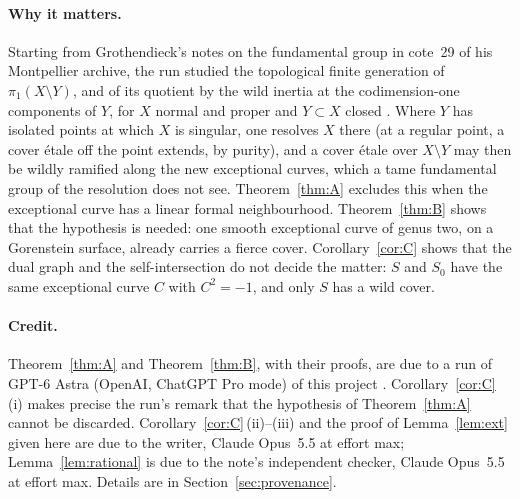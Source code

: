 \documentclass[11pt,a4paper]{article}
\theoremstyle{definition}
\begin{document}
\paragraph{Why it matters.} Starting from Grothendieck's notes on the
fundamental group in cote~29 of his Montpellier archive, the run
\cite{SA12} studied the topological finite generation of
$\pi_1(X\setminus Y)$, and of its quotient by the wild inertia at the
codimension-one components of $Y$, for $X$ normal and proper and $Y\subset
X$ closed \cite[\S4.1]{SA12}. Where $Y$ has isolated points at which $X$ is
singular, one resolves $X$ there (at a regular point, a cover \'etale off the
point extends, by purity), and a cover \'etale over $X\setminus Y$ may then
be wildly ramified along the new exceptional curves, which a tame fundamental group of the
resolution does not see. Theorem~\ref{thm:A} excludes this when the
exceptional curve has a linear formal neighbourhood. Theorem~\ref{thm:B}
shows that the hypothesis is needed: one smooth exceptional curve of genus
two, on a Gorenstein surface, already carries a fierce cover. Corollary~\ref{cor:C} shows that the dual graph and the
self-intersection do not decide the matter: $S$ and $S_0$ have the same
exceptional curve $C$ with $C^2=-1$, and only $S$ has a wild cover.

\paragraph{Credit.} Theorem~\ref{thm:A} and Theorem~\ref{thm:B}, with their
proofs, are due to a run of GPT-6 Astra (OpenAI, ChatGPT Pro mode) of this
project \cite{SA12}. Corollary~\ref{cor:C}\,(i) makes precise the run's remark
that the hypothesis of Theorem~\ref{thm:A} cannot be discarded.
Corollary~\ref{cor:C}\,(ii)--(iii) and the proof of Lemma~\ref{lem:ext}
given here are due to the writer, Claude Opus~5.5 at effort max;
Lemma~\ref{lem:rational} is due to the note's independent checker, Claude
Opus~5.5 at effort max. Details are in Section~\ref{sec:provenance}.
\end{document}
